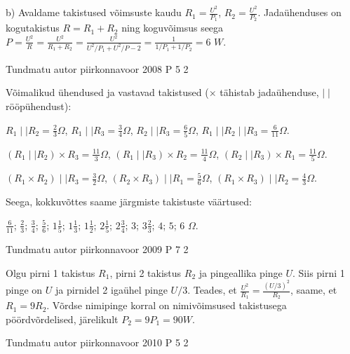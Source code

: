 \documentclass[11pt]{article}
\begin{document}
{{b) Avaldame takistused võimsuste kaudu
$R_1 = \frac{U^2}{P_1}$, $R_2 = \frac{U^2}{P_2}$.
Jadaühenduses on kogutakistus $R = R_1 + R_2 $ ning koguvõimsus seega
$P = \frac{U^2}{R} = \frac{U^2}{R_1 + R_2} = \frac{U^2}{U^2 / P_1 + U^2/P-2} = \frac{1}{1/P_1 + 1/P_2} = 6$ $W$.
\fi
}

{Tundmatu autor} %
{piirkonnavoor} %
{2008} %
{P 5} %
{2} %
{

\ifSolution
Võimalikud ühendused ja vastavad takistused ($\times$ tähistab jadaühenduse, $\mid \mid$ rööpühendust):
\begin{center}
$R_1 \mid\mid R_2 = \frac{2}{3} \Omega$,
$R_1 \mid\mid R_3 = \frac{3}{4} \Omega$,
$R_2 \mid\mid R_3 = \frac{6}{5} \Omega$,
$R_1 \mid\mid R_2 \mid\mid R_3 = \frac{6}{11} \Omega$.
\end{center}

\begin{center}
$(R_1 \mid\mid R_2) \times R_3 = \frac{11}{3} \Omega$,
$(R_1 \mid\mid R_3) \times R_2 = \frac{11}{4} \Omega$,
$(R_2 \mid\mid R_3) \times R_1 = \frac{11}{5} \Omega$.
\end{center}

\begin{center}
$(R_1 \times R_2) \mid\mid R_3 = \frac{3}{2} \Omega$,
$(R_2 \times R_3) \mid\mid R_1 = \frac{5}{6} \Omega$,
$(R_1 \times R_3) \mid\mid R_2 = \frac{4}{3} \Omega$.
\end{center}

Seega, kokkuvõttes saame järgmiste takistuste väärtused:
\begin{center}
$\frac{6}{11}$;
$\frac{2}{3}$;
$\frac{3}{4}$;
$\frac{5}{6}$;
$1\frac{1}{5}$;
$1\frac{1}{3}$;
$1\frac{1}{2}$;
$2\frac{1}{5}$;
$2\frac{3}{4}$;
$3$;
$3\frac{2}{3}$;
$4$;
$5$;
$6$
$\Omega$.
\end{center}
\fi
}

{Tundmatu autor} %
{piirkonnavoor} %
{2009} %
{P 7} %
{2} %
{

\ifSolution
Olgu pirni 1 takistus $R_1$, pirni 2 takistus $R_2$ ja pingeallika pinge $U$. Siis pirni 1 pinge on $U$ ja pirnidel 2 igaühel pinge $U/3$. Teades, et 
$\frac{U^2}{R_1} = \frac{(U/3)^2}{R_2}$,
saame, et $R_1 = 9 R_2$. Võrdse nimipinge korral on nimivõimsused takistusega pöördvõrdelised, järelikult $P_2 = 9P_1 = 90 W$.
\fi
}

{Tundmatu autor} %
{piirkonnavoor} %
{2010} %
{P 5} %
{2} %
{

}}
\end{document}
